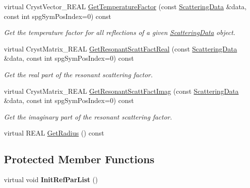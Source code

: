 \begin{DoxyCompactItemize}
\item 
virtual Cryst\+Vector\+\_\+\+R\+E\+AL \mbox{\hyperlink{class_obj_cryst_1_1_global_scattering_power_a52a96c9df409e14e5209fa0d1c16781c}{Get\+Temperature\+Factor}} (const \mbox{\hyperlink{class_obj_cryst_1_1_scattering_data}{Scattering\+Data}} \&data, const int spg\+Sym\+Pos\+Index=0) const
\begin{DoxyCompactList}\small\item\em Get the temperature factor for all reflections of a given \mbox{\hyperlink{class_obj_cryst_1_1_scattering_data}{Scattering\+Data}} object. \end{DoxyCompactList}\item 
virtual Cryst\+Matrix\+\_\+\+R\+E\+AL \mbox{\hyperlink{class_obj_cryst_1_1_global_scattering_power_a9dd42d2bf3990261d0ba88a8478dd45a}{Get\+Resonant\+Scatt\+Fact\+Real}} (const \mbox{\hyperlink{class_obj_cryst_1_1_scattering_data}{Scattering\+Data}} \&data, const int spg\+Sym\+Pos\+Index=0) const
\begin{DoxyCompactList}\small\item\em Get the real part of the resonant scattering factor. \end{DoxyCompactList}\item 
virtual Cryst\+Matrix\+\_\+\+R\+E\+AL \mbox{\hyperlink{class_obj_cryst_1_1_global_scattering_power_af570597de2c717e60b63507745e32e32}{Get\+Resonant\+Scatt\+Fact\+Imag}} (const \mbox{\hyperlink{class_obj_cryst_1_1_scattering_data}{Scattering\+Data}} \&data, const int spg\+Sym\+Pos\+Index=0) const
\begin{DoxyCompactList}\small\item\em Get the imaginary part of the resonant scattering factor. \end{DoxyCompactList}\item 
virtual R\+E\+AL \mbox{\hyperlink{class_obj_cryst_1_1_global_scattering_power_af70a0e97e094efd9b45e75122b43d2ea}{Get\+Radius}} () const
\end{DoxyCompactItemize}
\subsection*{Protected Member Functions}
\begin{DoxyCompactItemize}
\item 
\mbox{\label{class_obj_cryst_1_1_global_scattering_power_ab70c4fbd2b7408d1386886262cf6f3f9}} 
virtual void {\bfseries Init\+Ref\+Par\+List} ()
\end{DoxyCompactItemize}
